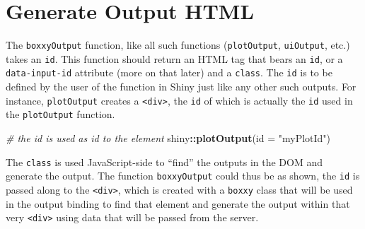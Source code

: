 \documentclass[10pt,]{krantz}
\makeatletter
\newenvironment{Shaded}{\begin{snugshade}}{\end{snugshade}}
\newcommand{\CommentTok}[1]{\textcolor[rgb]{0.37,0.37,0.37}{\textit{#1}}}
\newcommand{\ControlFlowTok}[1]{\textcolor[rgb]{0.27,0.27,0.27}{\textbf{#1}}}
\newcommand{\DataTypeTok}[1]{\textcolor[rgb]{0.27,0.27,0.27}{#1}}
\newcommand{\KeywordTok}[1]{\textcolor[rgb]{0.27,0.27,0.27}{\textbf{#1}}}
\newcommand{\NormalTok}[1]{#1}
\newcommand{\OperatorTok}[1]{\textcolor[rgb]{0.43,0.43,0.43}{\textbf{#1}}}
\newcommand{\OtherTok}[1]{\textcolor[rgb]{0.37,0.37,0.37}{#1}}
\newcommand{\StringTok}[1]{\textcolor[rgb]{0.5,0.5,0.5}{#1}}
\newenvironment{kframe}{%
\medskip{}
\setlength{\fboxsep}{.8em}
 \def\at@end@of@kframe{}%
 \ifinner\ifhmode%
  \def\at@end@of@kframe{\end{minipage}}%
  \begin{minipage}{\columnwidth}%
 \fi\fi%
 \def\FrameCommand##1{\hskip\@totalleftmargin \hskip-\fboxsep
 \colorbox{shadecolor}{##1}\hskip-\fboxsep
     \hskip-\linewidth \hskip-\@totalleftmargin \hskip\columnwidth}%
 \MakeFramed {\advance\hsize-\width
   \@totalleftmargin\z@ \linewidth\hsize
   \@setminipage}}%
 {\par\unskip\endMakeFramed%
 \at@end@of@kframe}
\renewenvironment{Shaded}{\begin{kframe}}{\end{kframe}}
\makeatother
\begin{document}
\hypertarget{shiny-output-html}{%
\section{Generate Output HTML}\label{shiny-output-html}}

The \texttt{boxxyOutput} function, like all such functions (\texttt{plotOutput}, \texttt{uiOutput}, etc.) takes an \texttt{id}. This function should return an HTML tag that bears an \texttt{id}, or a \texttt{data-input-id} attribute (more on that later) and a \texttt{class}. The \texttt{id} is to be defined by the user of the function in Shiny just like any other such outputs. For instance, \texttt{plotOutput} creates a \texttt{\textless{}div\textgreater{}}, the \texttt{id} of which is actually the \texttt{id} used in the \texttt{plotOutput} function.

\begin{Shaded}
\begin{Highlighting}[]
\CommentTok{# the id is used as id to the element}
\NormalTok{shiny}\OperatorTok{::}\KeywordTok{plotOutput}\NormalTok{(}\DataTypeTok{id =} \StringTok{"myPlotId"}\NormalTok{)}
\end{Highlighting}
\end{Shaded}

\begin{Shaded}
\end{Shaded}

The \texttt{class} is used JavaScript-side to ``find'' the outputs in the DOM and generate the output. The function \texttt{boxxyOutput} could thus be as shown, the \texttt{id} is passed along to the \texttt{\textless{}div\textgreater{}}, which is created with a \texttt{boxxy} class that will be used in the output binding to find that element and generate the output within that very \texttt{\textless{}div\textgreater{}} using data that will be passed from the server.

\begin{Shaded}
\end{Shaded}
\end{document}
